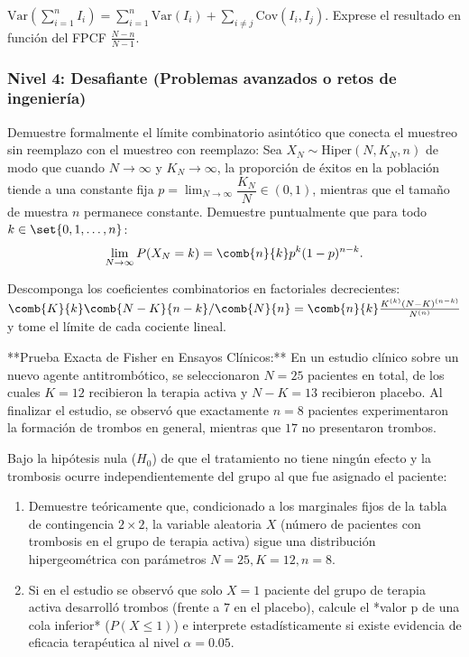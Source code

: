 \begin{sugerencia}
	$\text{Var}\left(\sum_{i=1}^n I_i\right) = \sum_{i=1}^n \text{Var}(I_i) + \sum_{i \neq j} \text{Cov}(I_i, I_j)$. Exprese el resultado en función del FPCF $\frac{N-n}{N-1}$.
\end{sugerencia}

\subsubsection*{Nivel 4: Desafiante (Problemas avanzados o retos de ingeniería)}

\begin{problema}
	\label{prob:3.6.9}
	Demuestre formalmente el límite combinatorio asintótico que conecta el muestreo sin reemplazo con el muestreo con reemplazo:
	Sea $X_N \sim \text{Hiper}(N, K_N, n)$ de modo que cuando $N \to \infty$ y $K_N \to \infty$, la proporción de éxitos en la población tiende a una constante fija $p = \lim_{N \to \infty} \dfrac{K_N}{N} \in (0, 1)$, mientras que el tamaño de muestra $n$ permanece constante. Demuestre puntualmente que para todo $k \in \set{0, 1, \dots, n}$:
	\begin{align*}
		\lim_{N \to \infty} P(X_N = k) = \comb{n}{k} p^k (1-p)^{n-k}.
	\end{align*}
\end{problema}

\begin{sugerencia}
	Descomponga los coeficientes combinatorios en factoriales decrecientes: $\comb{K}{k}\comb{N-K}{n-k}/\comb{N}{n} = \comb{n}{k} \frac{K^{(k)} (N-K)^{(n-k)}}{N^{(n)}}$ y tome el límite de cada cociente lineal.
\end{sugerencia}

\begin{problema}
	\label{prob:3.6.10}
	**Prueba Exacta de Fisher en Ensayos Clínicos:**
	En un estudio clínico sobre un nuevo agente antitrombótico, se seleccionaron $N=25$ pacientes en total, de los cuales $K=12$ recibieron la terapia activa y $N-K=13$ recibieron placebo. Al finalizar el estudio, se observó que exactamente $n=8$ pacientes experimentaron la formación de trombos en general, mientras que $17$ no presentaron trombos.
	
	Bajo la hipótesis nula ($H_0$) de que el tratamiento no tiene ningún efecto y la trombosis ocurre independientemente del grupo al que fue asignado el paciente:
	\begin{enumerate}
		\item Demuestre teóricamente que, condicionado a los marginales fijos de la tabla de contingencia $2 \times 2$, la variable aleatoria $X$ (número de pacientes con trombosis en el grupo de terapia activa) sigue una distribución hipergeométrica con parámetros $N=25, K=12, n=8$.
		\item Si en el estudio se observó que solo $X = 1$ paciente del grupo de terapia activa desarrolló trombos (frente a $7$ en el placebo), calcule el *valor p de una cola inferior* ($P(X \le 1)$) e interprete estadísticamente si existe evidencia de eficacia terapéutica al nivel $\alpha = 0.05$.
	\end{enumerate}
\end{problema}

